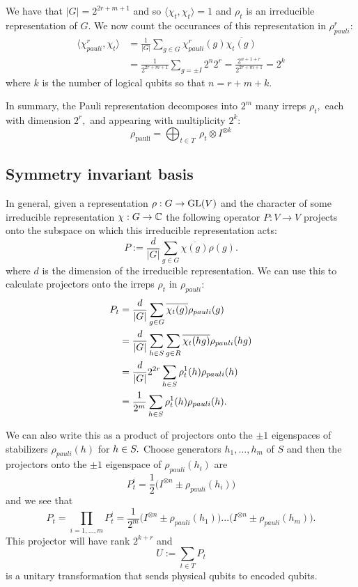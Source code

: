 We have that $|G|=2^{2r+m+1}$ and so
$\langle\chi_{t},\chi_{t}\rangle = 1$ and
$\rho_t$ is an irreducible representation of $G.$
We now count the occurances of 
this representation in $\rho^r_{pauli}$:
\begin{align*}
\langle\chi^r_{pauli},\chi_{t}\rangle &= \frac{1}{|G|}\sum_{g\in G} \chi^r_{pauli}(g)\overline{\chi_{t}(g)} \\
&= \frac{1}{2^{2r+m+1}} \sum_{g=\pm I} 2^n 2^r = \frac{2^{n+1+r}}{2^{2r+m+1}} = 2^k
\end{align*}
where $k$ is the number of logical qubits so that $n=r+m+k.$

In summary, the Pauli representation decomposes into 
$2^m$ many irreps $\rho_t,$ 
each with dimension $2^r,$ 
and appearing with multiplicity $2^k:$
$$
    \rho_{\mathrm{pauli}} = 
        \bigoplus_{t\in T}\ \rho_t \otimes I^{\otimes k}
$$

\subsection{Symmetry invariant basis}

In general, given a representation $\rho:G\to \mathrm{GL}(V)$
and the character of some irreducible representation $\chi:G\to \mathbb{C}$
the following operator 
$P:V\to V$
projects onto the subspace on which
this irreducible representation acts:
$$
    P := \frac{d}{|G|} \sum_{g\in G} {\overline{\chi(g)}} \rho(g).
$$
where $d$ is the dimension of the irreducible representation.
We can use this to calculate projectors onto the irreps $\rho_t$ in $\rho_{pauli}$:
\begin{align*}
P_t &= \frac{d}{|G|} \sum_{g\in G} \overline{\chi_t(g)} \rho_{pauli}(g) \\
    &= \frac{d}{|G|} \sum_{h\in S}\sum_{g\in R} \overline{\chi_t(hg)} \rho_{pauli}(hg) \\
    &= \frac{d}{|G|} 2^{2r} \sum_{h\in S} {\rho^1_t(h)} \rho_{pauli}(h) \\
    &= \frac{1}{2^m} \sum_{h\in S} {\rho^1_t(h)} \rho_{pauli}(h).
\end{align*}

We can also write this as a product of projectors onto
the $\pm 1$ eigenspaces of stabilizers $\rho_{pauli}(h)$ for $h\in S.$
Choose generators $h_1,...,h_m$ of $S$
and then the projectors onto the $\pm 1$ eigenspace of $\rho_{pauli}(h_i)$ are
$$
P^i_t = \frac{1}{2} \bigl(I^{\otimes n} \pm \rho_{pauli}(h_i) \bigr)
$$
and we see that 
$$
P_t = \prod_{i=1,...,m} P^i_t 
    = \frac{1}{2^m} \bigl(I^{\otimes n} \pm \rho_{pauli}(h_1)\bigr)
    ...\bigl(I^{\otimes n} \pm \rho_{pauli}(h_m)\bigr).
$$
This projector will have rank $2^{k+r}$ and
$$
U := \sum_{t\in T} P_t
$$
is a unitary transformation that sends
physical qubits to encoded qubits.


